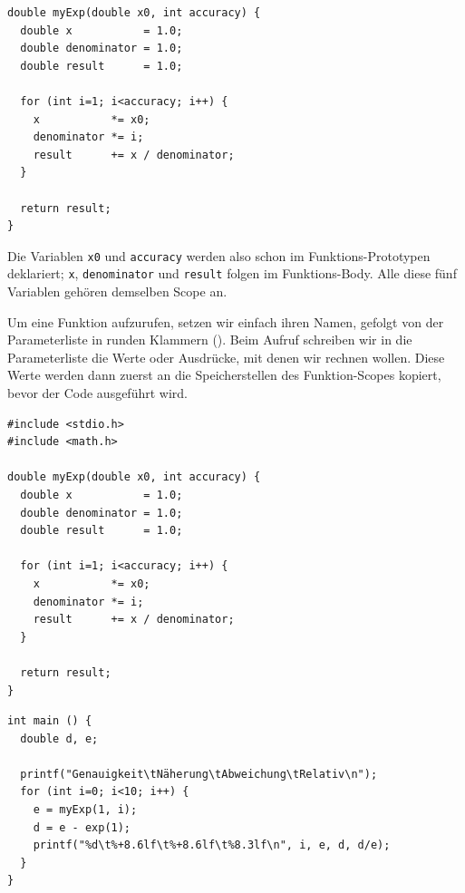 \begin{codebox}
\begin{verbatim}
double myExp(double x0, int accuracy) {
  double x           = 1.0;
  double denominator = 1.0;
  double result      = 1.0;
  
  for (int i=1; i<accuracy; i++) {
    x           *= x0;
    denominator *= i;
    result      += x / denominator;
  }
  
  return result;
}
\end{verbatim}
\end{codebox}

Die Variablen \texttt{x0} und \texttt{accuracy} werden also schon im Funktions-Prototypen deklariert; \texttt{x}, \texttt{denominator} und \texttt{result} folgen im Funktions-Body. Alle diese fünf Variablen gehören demselben Scope an.

Um eine Funktion aufzurufen, setzen wir einfach ihren Namen, gefolgt von der Parameterliste in runden Klammern (). Beim Aufruf schreiben wir in die Parameterliste die Werte oder Ausdrücke, mit denen wir rechnen wollen. Diese Werte werden dann zuerst an die Speicherstellen des Funktion-Scopes kopiert, bevor der Code ausgeführt wird.

\begin{codebox}
\begin{verbatim}
#include <stdio.h>
#include <math.h>

double myExp(double x0, int accuracy) {
  double x           = 1.0;
  double denominator = 1.0;
  double result      = 1.0;
  
  for (int i=1; i<accuracy; i++) {
    x           *= x0;
    denominator *= i;
    result      += x / denominator;
  }
  
  return result;
}
\end{verbatim}
\end{codebox}

\begin{codebox}[]
\begin{verbatim}
int main () {
  double d, e;
  
  printf("Genauigkeit\tNäherung\tAbweichung\tRelativ\n");  
  for (int i=0; i<10; i++) {
    e = myExp(1, i);
    d = e - exp(1);
    printf("%d\t%+8.6lf\t%+8.6lf\t%8.3lf\n", i, e, d, d/e);
  }
}
\end{verbatim}
\end{codebox}

